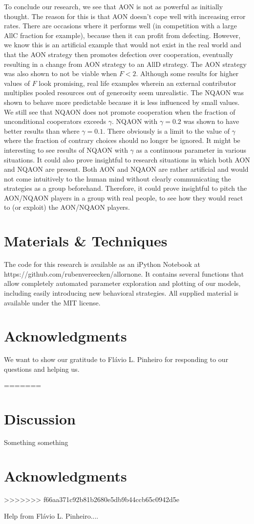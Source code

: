 \documentclass[letterpaper]{article}
\begin{document}
To conclude our research, we see that AON is not as powerful as initially thought. The reason for this is that AON doesn't cope well with increasing error rates. There are occasions where it performs well (in competition with a large AllC fraction for example), because then it can profit from defecting. However, we know this is an artificial example that would not exist in the real world and that the AON strategy then promotes defection over cooperation, eventually resulting in a change from AON strategy to an AllD strategy. The AON strategy was also shown to not be viable when $F<2$. Although some results for higher values of $F$ look promising, real life examples wherein an external contributor multiplies pooled resources out of generosity seem unrealistic.
The NQAON was shown to behave more predictable because it is less influenced by small values. We still see that NQAON does not promote cooperation when the fraction of unconditional cooperators exceeds $\gamma$.
NQAON with $\gamma = 0.2$ was shown to have better results than where $\gamma=0.1$. There obviously is a limit to the value of $\gamma$ where the fraction of contrary choices should no longer be ignored. It might be interesting to see results of NQAON with $\gamma$ as a continuous parameter in various situations. It could also prove insightful to research situations in which both AON and NQAON are present.
Both AON and NQAON are rather artificial and would not come intuitively to the human mind without clearly communicating the strategies as a group beforehand. Therefore, it could prove insightful to pitch the AON/NQAON players in a group with real people, to see how they would react to (or exploit) the AON/NQAON players.

\section{Materials \& Techniques}
The code for this research is available as an iPython Notebook at https://github.com/rubenvereecken/allornone. It contains several functions that allow completely automated parameter exploration and plotting of our models, including easily introducing new behavioral strategies. All supplied material is available under the MIT license. 

\section{Acknowledgments}
We want to show our gratitude to Fl\'{a}vio L. Pinheiro for responding to our questions and helping us.

=======
\section{Discussion}
Something something

\section{Acknowledgments}
>>>>>>> f66aa371c92b81b2680e5db9b44ccb65c0942d5e

Help from Fl\'{a}vio L. Pinheiro....


\footnotesize


\end{document}
